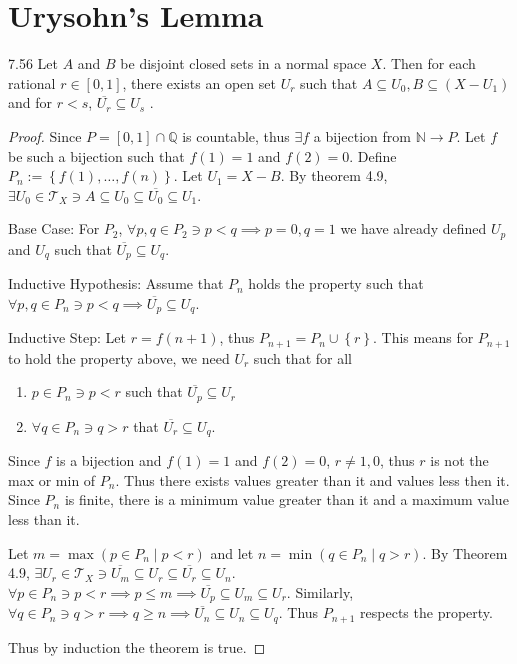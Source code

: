 \documentclass{article}
\newcommand*{\T}{\mathcal{T}}
\newcommand*{\subeq}{\subseteq}
\newcommand{\Q}{\mathbb{Q}}
\newcommand{\N}{\mathbb{N}}
\begin{document}
\section*{Urysohn's Lemma}
\begin{claim}{7.56}\label{Claim 7.56.}
    Let $A$ and $B$ be disjoint closed sets in a normal space $X$. Then for each rational $r \in [0, 1]$, there exists an open set $U_r$ such that $A \subeq U_0, B \subeq (X - U_1)$ and for $r < s$, $\overline{U_r} \subeq U_s$ .
\end{claim}
\begin{proof}    
    Since $P = [0, 1] \cap \Q$ is countable, thus $\exists f$ a bijection from $\N \to P$. Let $f$ be such a bijection such that $f(1) = 1$ and $f(2) = 0$. Define $P_n := \left\{f(1), \dots, f(n) \right\}$. Let $U_1 = X - B$. By theorem 4.9, $\exists U_0 \in \T_X \ni A \subeq U_0 \subeq \overline{U_0} \subeq U_1$. 
    
    Base Case: For $P_2$, $\forall p, q \in P_2 \ni p < q \implies p = 0, q = 1$ we have already defined $U_p$ and $U_q$ such that $\overline{U_p} \subeq U_q$. 
    
    Inductive Hypothesis: Assume that $P_n$ holds the property such that $\forall p, q \in P_n \ni p < q \implies \overline{U_p} \subeq U_q$. 

    Inductive Step: Let $r = f(n + 1)$, thus $P_{n + 1} = P_n \cup \left\{ r \right\}$. This means for $P_{n + 1}$ to hold the property above, we need $U_r$ such that for all 
    
    \begin{enumerate}
        \item $p \in P_{n} \ni p < r$ such that $\overline{U_{p}} \subeq U_r$
        \item $\forall q \in P_n \ni q > r$ that $\overline{U_r} \subeq U_q$.
    \end{enumerate}
    
    Since $f$ is a bijection and $f(1) = 1$ and $f(2) = 0$, $r \neq 1, 0$, thus $r$ is not the max or min of $P_n$. Thus there exists values greater than it and values less then it. Since $P_n$ is finite, there is a minimum value greater than it and a maximum value less than it.         

    Let $m = \max(p \in P_n \mid p < r)$ and let $n = \min(q \in P_n \mid q > r)$. By Theorem 4.9, $\exists U_r \in \T_X \ni \overline{U_m} \subeq U_r \subeq \overline{U_r} \subeq U_n$. $\forall p \in P_n \ni p < r\implies p \leq m \implies \overline{U_p} \subeq U_m \subeq U_r$. Similarly, $\forall q \in P_n \ni q > r \implies q \geq n \implies \overline{U_n} \subeq U_n \subeq U_q$. Thus $P_{n + 1}$ respects the property. 
    
    
    Thus by induction the theorem is true. 

\end{proof}
\end{document}
